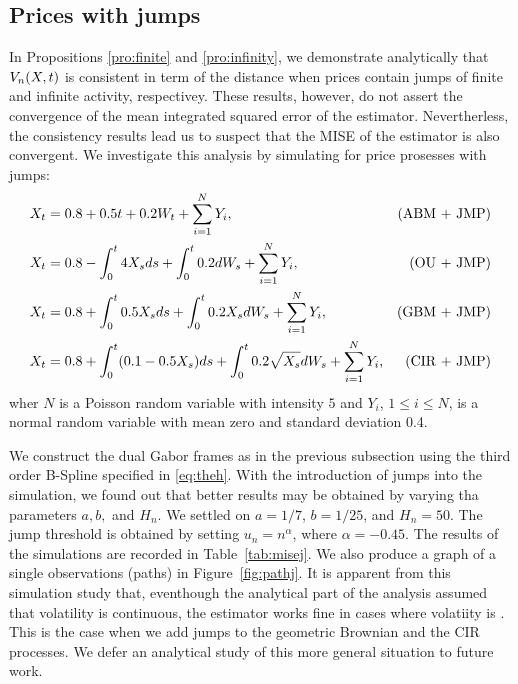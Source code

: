  \subsection{Prices with jumps}
 In Propositions \eqref{pro:finite} and \eqref{pro:infinity}, we demonstrate analytically that $V_n(X, t)$ is consistent in term of the \Ltwo distance when prices contain jumps of finite and infinite activity, respectivey. These results, however, do not assert the convergence of the mean integrated squared error of the estimator. Nevertherless, the consistency results lead us to suspect that the MISE of the estimator is also convergent. We investigate this analysis by simulating for price prosesses with jumps:    
\begin{align}
  & X_t = 0.8 +  0.5  t + 0.2  W_t + \sum_{i = 1}^N Y_i,\notag & \text{(ABM + JMP)}\\
  & X_t = 0.8 -\int_0^t 4 X_s d s + \int^t_0 0.2 d W_s +  \sum_{i = 1}^N Y_i ,\notag & \text{(OU + JMP)}\\
  & X_t = 0.8 + \int_0^t 0.5 X_s d s + \int^t_0 0.2 X_s d W_s + \sum_{i = 1}^N Y_i,\notag & \text{(GBM + JMP)}\\
  & X_t = 0.8 + \int_0^t(0.1 - 0.5 X_s)d s +\int^t_0  0.2 \sqrt{X_s} d W_s + \sum_{i = 1}^N Y_i,\notag & \text{(CIR + JMP)}
  \label{}
\end{align}
wher $N$ is a Poisson random variable with intensity $5$ and $Y_i$, $1 \le  i\le N$, is a normal random variable with mean zero and standard deviation 0.4.  

We construct the dual  Gabor frames as in the previous subsection using the  third order B-Spline specified in \eqref{eq:theh}. With the introduction of jumps into the simulation, we found out that better results may be obtained by varying tha parameters $a,b,$ and $H_n$. We settled on $a = 1/7$, $b = 1/25$, and $H_n = 50$. The jump threshold is obtained by setting $u_n = n^{\alpha}$, where $\alpha = -0.45$. The results of the simulations are recorded in Table~\ref{tab:misej}. We also produce a graph of a single observations (paths) in Figure~\ref{fig:pathj}. It is apparent from this simulation study that, eventhough the analytical part of the analysis assumed that volatility is continuous, the estimator \jvn works fine in cases where volatiity is \cadlag. This is the case when we add jumps to the geometric Brownian  and the CIR processes. We defer an analytical study of this more general situation to future work.


